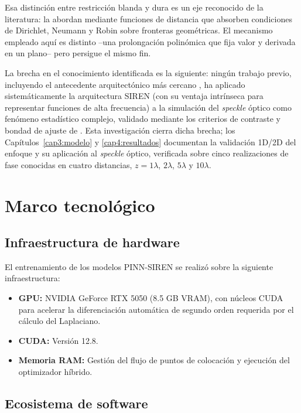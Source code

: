 Esa distinción entre restricción blanda y dura es un eje reconocido de la
literatura: \textcite{sukumar2022exact} la abordan mediante funciones de
distancia que absorben condiciones de Dirichlet, Neumann y Robin sobre fronteras
geométricas. El mecanismo empleado aquí es distinto --una prolongación
polinómica que fija valor y derivada en un plano-- pero persigue el mismo fin.

La brecha en el conocimiento identificada es la siguiente: ningún trabajo
previo, incluyendo el antecedente arquitectónico más cercano
\parencite{panagiotakopoulos2026helmholtz}, ha aplicado sistemáticamente la
arquitectura SIREN \parencite{sitzmann2020siren} (con su ventaja intrínseca
para representar funciones de alta frecuencia) a la simulación del
\textit{speckle} óptico como fenómeno estadístico complejo, validado
mediante los criterios de contraste y bondad de ajuste de
\textcite{goodman2007speckle}. Esta investigación cierra dicha brecha; los
Capítulos~\ref{cap3:modelo} y \ref{cap4:resultados} documentan la validación
1D/2D del enfoque y su aplicación al \textit{speckle} óptico, verificada sobre
cinco realizaciones de fase conocidas en cuatro distancias,
$z=1\lambda$, $2\lambda$, $5\lambda$ y $10\lambda$.

\section{Marco tecnológico}

\subsection{Infraestructura de hardware}

El entrenamiento de los modelos PINN-SIREN se realizó sobre la siguiente
infraestructura:

\begin{itemize}
    \item \textbf{GPU:} NVIDIA GeForce RTX 5050 (8.5 GB VRAM), con núcleos
    CUDA para acelerar la diferenciación automática de segundo orden requerida
    por el cálculo del Laplaciano.
    \item \textbf{CUDA:} Versión 12.8.
    \item \textbf{Memoria RAM:} Gestión del flujo de puntos de colocación y
    ejecución del optimizador híbrido.
\end{itemize}

\subsection{Ecosistema de software}

